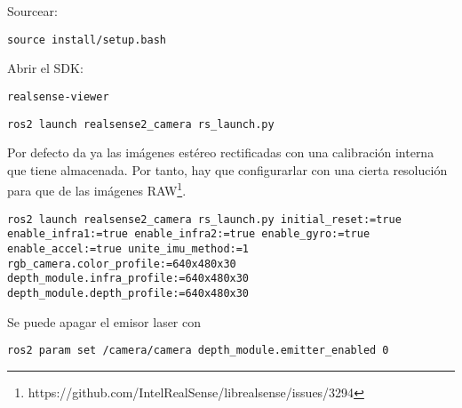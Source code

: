 \documentclass[apunte]{lcc}
\begin{document}
Sourcear:
\begin{lstlisting}[style=bash]
source install/setup.bash
\end{lstlisting}

Abrir el SDK:
\begin{lstlisting}[style=bash]
realsense-viewer
\end{lstlisting}

\begin{lstlisting}[style=bash]
ros2 launch realsense2_camera rs_launch.py
\end{lstlisting}

Por defecto da ya las imágenes estéreo rectificadas con una calibración interna que tiene almacenada. Por tanto, hay que configurarlar con una cierta resolución para que de las imágenes RAW\footnote{https://github.com/IntelRealSense/librealsense/issues/3294}.

\begin{lstlisting}[style=bash]
ros2 launch realsense2_camera rs_launch.py initial_reset:=true enable_infra1:=true enable_infra2:=true enable_gyro:=true enable_accel:=true unite_imu_method:=1 rgb_camera.color_profile:=640x480x30 depth_module.infra_profile:=640x480x30 depth_module.depth_profile:=640x480x30
\end{lstlisting}

Se puede apagar el emisor laser con

\begin{lstlisting}[style=bash]
ros2 param set /camera/camera depth_module.emitter_enabled 0
\end{lstlisting}
\end{document}
